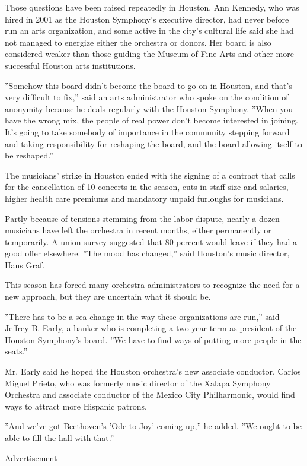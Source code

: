 Those questions have been raised repeatedly in Houston. Ann Kennedy, who
was hired in 2001 as the Houston Symphony's executive director, had
never before run an arts organization, and some active in the city's
cultural life said she had not managed to energize either the orchestra
or donors. Her board is also considered weaker than those guiding the
Museum of Fine Arts and other more successful Houston arts institutions.

''Somehow this board didn't become the board to go on in Houston, and
that's very difficult to fix,'' said an arts administrator who spoke on
the condition of anonymity because he deals regularly with the Houston
Symphony. ''When you have the wrong mix, the people of real power don't
become interested in joining. It's going to take somebody of importance
in the community stepping forward and taking responsibility for
reshaping the board, and the board allowing itself to be reshaped.''

The musicians' strike in Houston ended with the signing of a contract
that calls for the cancellation of 10 concerts in the season, cuts in
staff size and salaries, higher health care premiums and mandatory
unpaid furloughs for musicians.

Partly because of tensions stemming from the labor dispute, nearly a
dozen musicians have left the orchestra in recent months, either
permanently or temporarily. A union survey suggested that 80 percent
would leave if they had a good offer elsewhere. ''The mood has
changed,'' said Houston's music director, Hans Graf.

This season has forced many orchestra administrators to recognize the
need for a new approach, but they are uncertain what it should be.

''There has to be a sea change in the way these organizations are run,''
said Jeffrey B. Early, a banker who is completing a two-year term as
president of the Houston Symphony's board. ''We have to find ways of
putting more people in the seats.''

Mr. Early said he hoped the Houston orchestra's new associate conductor,
Carlos Miguel Prieto, who was formerly music director of the Xalapa
Symphony Orchestra and associate conductor of the Mexico City
Philharmonic, would find ways to attract more Hispanic patrons.

''And we've got Beethoven's 'Ode to Joy' coming up,'' he added. ''We
ought to be able to fill the hall with that.''

Advertisement


